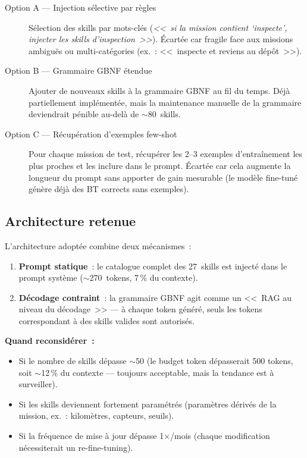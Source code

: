 \documentclass[a4paper,11pt]{article}
\begin{document}
\begin{description}
    \item[Option A --- Injection sélective par règles] Sélection des skills
    par mots-clés (\emph{<<~si la mission contient `inspecte', injecter les
    skills d'inspection~>>}). Écartée car fragile face aux missions ambiguës
    ou multi-catégories (ex.~: <<~inspecte et reviens au dépôt~>>).

    \item[Option B --- Grammaire GBNF étendue] Ajouter de nouveaux skills à
    la grammaire GBNF au fil du temps. Déjà partiellement implémentée, mais
    la maintenance manuelle de la grammaire deviendrait pénible au-delà de
    $\sim$80~skills.

    \item[Option C --- Récupération d'exemples few-shot] Pour chaque mission
    de test, récupérer les 2--3 exemples d'entraînement les plus proches et
    les inclure dans le prompt. Écartée car cela augmente la longueur du
    prompt sans apporter de gain mesurable (le modèle fine-tuné génère déjà
    des BT corrects sans exemples).
\end{description}

\subsection{Architecture retenue}

L'architecture adoptée combine deux mécanismes~:

\begin{enumerate}
    \item \textbf{Prompt statique}~: le catalogue complet des 27~skills est
    injecté dans le prompt système ($\sim$270~tokens, 7\,\% du contexte).
    \item \textbf{Décodage contraint}~: la grammaire GBNF agit comme un
    <<~RAG au niveau du décodage~>> --- à chaque token généré, seuls les
    tokens correspondant à des skills valides sont autorisés.
\end{enumerate}

\textbf{Quand reconsidérer~:}
\begin{itemize}
    \item Si le nombre de skills dépasse $\sim$50 (le budget token
    dépasserait 500 tokens, soit $\sim$12\,\% du contexte --- toujours
    acceptable, mais la tendance est à surveiller).
    \item Si les skills deviennent fortement paramétrés (paramètres dérivés
    de la mission, ex.~: kilomètres, capteurs, seuils).
    \item Si la fréquence de mise à jour dépasse 1$\times$/mois (chaque
    modification nécessiterait un re-fine-tuning).
\end{itemize}
\end{document}
